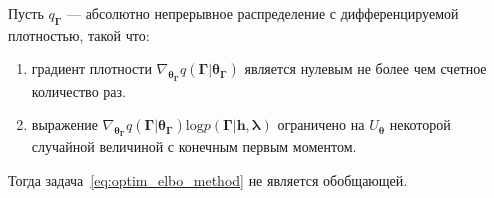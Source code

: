 \begin{theorem}
Пусть $q_{\boldsymbol{\Gamma}}$ --- абсолютно непрерывное распределение с дифференцируемой плотностью, такой что:
\begin{enumerate}
\item градиент плотности $\nabla_{\boldsymbol{\theta}_{\boldsymbol{\Gamma}}} q(\boldsymbol{\Gamma}|\boldsymbol{\theta}_{\boldsymbol{\Gamma}})$ является нулевым не более чем счетное количество раз. 
\item выражение $\nabla_{\boldsymbol{\theta}_{\boldsymbol{\Gamma}}} q(\boldsymbol{\Gamma}|\boldsymbol{\theta}_{\boldsymbol{\Gamma}}) \text{log}p(\boldsymbol{\Gamma}|\mathbf{h}, \boldsymbol{\lambda})$ ограничено на $U_{\boldsymbol{\theta}}$ некоторой случайной величиной с конечным первым моментом.
\end{enumerate}
Тогда задача~\eqref{eq:optim_elbo_method} не является обобщающей.
\end{theorem}

